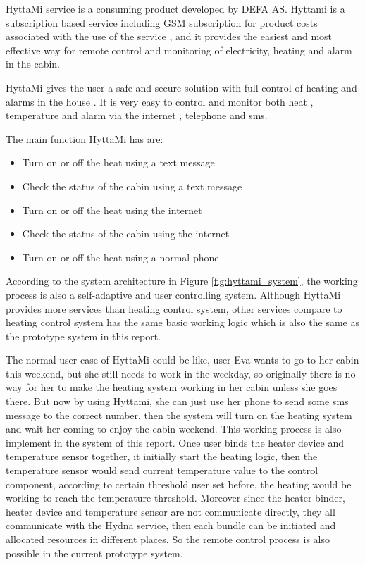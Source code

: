 \par HyttaMi\cite{hyttami} service is a consuming product developed by DEFA AS\cite{defa}. Hyttami is a subscription based service including GSM subscription for product costs associated with the use of the service , and it provides the easiest and most effective way for remote control and monitoring of electricity, heating and alarm in the cabin.
\par HyttaMi gives the user a safe and secure solution with full control of heating and alarms in the house . It is very easy to control and monitor both heat , temperature and alarm via the internet , telephone and sms.
\par The main function HyttaMi has are:
\begin{itemize}
	\item Turn on or off the heat using a text message
	\item Check the status of the cabin using a text message
	\item Turn on or off the heat using the internet
	\item Check the status of the cabin using the internet
	\item Turn on or off the heat using a normal phone
\end{itemize}
\par According to the system architecture in Figure \ref{fig:hyttami_system}, the working process is also a self-adaptive and user controlling system. Although HyttaMi provides more services than heating control system, other services compare to heating control system has the same basic working logic which is also the same as the prototype system in this report.

\par The normal user case of HyttaMi could be like, user Eva wants to go to her cabin this weekend, but she still needs to work in the weekday, so originally there is no way for her to make the heating system working in her cabin unless she goes there. But now by using Hyttami, she can just use her phone to send some sms message to the correct number, then the system will turn on the heating system and wait her coming to enjoy the cabin weekend. This working process is also implement in the system of this report. Once user binds the heater device and temperature sensor together, it initially start the heating logic, then the temperature sensor would send current temperature value to the control component, according to certain threshold user set before, the heating would be working to reach the temperature threshold. Moreover since the heater binder, heater device and temperature sensor are not communicate directly, they all communicate with the Hydna service, then each bundle can be initiated and allocated resources in different places. So the remote control process is also possible in the current prototype system.

